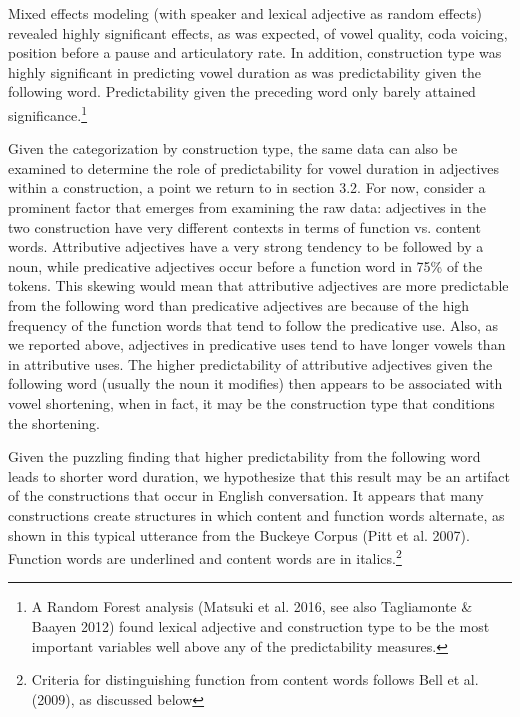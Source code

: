 \documentclass[12pt]{article}
\newenvironment{styleStandard}{\setlength\leftskip{0cm}\setlength\rightskip{0cm plus 1fil}\setlength\parindent{0cm}\setlength\parfillskip{0pt plus 1fil}\setlength\parskip{0in plus 1pt}\writerlistparindent\writerlistleftskip\leavevmode\normalfont\normalsize\writerlistlabel\ignorespaces}{\unskip\vspace{0.111in plus 0.0111in}\par}
\newcommand\writerlistleftskip{}
\newcommand\writerlistparindent{}
\newcommand\writerlistlabel{}
\begin{document}
\begin{styleStandard}
Mixed effects modeling (with speaker and lexical adjective as random effects) revealed highly significant effects, as was expected, of vowel quality, coda voicing, position before a pause and articulatory rate. In addition, construction type was highly significant in predicting vowel duration as was predictability given the following word. Predictability given the preceding word only barely attained significance.\footnote{ A Random Forest analysis (Matsuki et al. 2016, see also Tagliamonte \& Baayen 2012) found lexical adjective and construction type to be the most important variables well above any of the predictability measures.\par } 
\end{styleStandard}

\begin{styleStandard}
Given the categorization by construction type, the same data can also be examined to determine the role of predictability for vowel duration in adjectives within a construction, a point we return to in section 3.2. For now, consider a prominent factor that emerges from examining the raw data: adjectives in the two construction have very different contexts in terms of function vs. content words. Attributive adjectives have a very strong tendency to be followed by a noun, while predicative adjectives occur before a function word in 75\% of the tokens. This skewing would mean that attributive adjectives are more predictable from the following word than predicative adjectives are because of the high frequency of the function words that tend to follow the predicative use. Also, as we reported above, adjectives in predicative uses tend to have longer vowels than in attributive uses. The higher predictability of attributive adjectives given the following word (usually the noun it modifies) then appears to be associated with vowel shortening, when in fact, it may be the construction type that conditions the shortening. 
\end{styleStandard}

\begin{styleStandard}
Given the puzzling finding that higher predictability from the following word leads to shorter word duration, we hypothesize that this result may be an artifact of the constructions that occur in English conversation. It appears that many constructions create structures in which content and function words alternate, as shown in this typical utterance from the Buckeye Corpus (Pitt et al. 2007). Function words are underlined and content words are in italics.\footnote{Criteria for distinguishing function from content words follows Bell et al. (2009), as discussed below}
\end{styleStandard}
\end{document}
